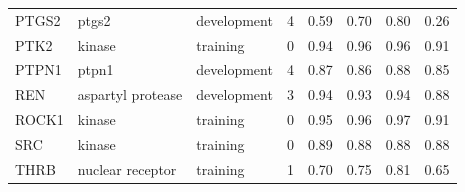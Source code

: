 \begin{longtable}{llllrrrr}
PTGS2 & ptgs2 & development & 4 & 0.59 & 0.70 & 0.80 & 0.26 \\
PTK2 & kinase & training & 0 & 0.94 & 0.96 & 0.96 & 0.91 \\
PTPN1 & ptpn1 & development & 4 & 0.87 & 0.86 & 0.88 & 0.85 \\
REN & aspartyl protease & development & 3 & 0.94 & 0.93 & 0.94 & 0.88 \\
ROCK1 & kinase & training & 0 & 0.95 & 0.96 & 0.97 & 0.91 \\
SRC & kinase & training & 0 & 0.89 & 0.88 & 0.88 & 0.88 \\
THRB & nuclear receptor & training & 1 & 0.70 & 0.75 & 0.81 & 0.65 \\
\bottomrule
\end{longtable}
